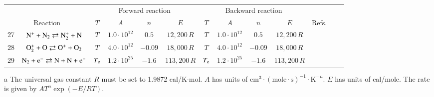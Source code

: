 \documentclass{warpdoc}
\renewcommand{\fontsizetable}{\footnotesize\scalefont{0.9}}
\begin{document}
\begin{table}[t]
\fontsizetable
\begin{center}
\begin{threeparttable}
\begin{tabular}{ccccccccccccc} 
\toprule
~&~&\multicolumn{4}{c}{Forward reaction} & \multicolumn{4}{c}{Backward reaction} & ~\\
 \cmidrule(lr){3-6}\cmidrule(lr){7-10}
\multicolumn{2}{c}{Reaction} & $T$ & $A$ & $n$ & $E$ & $T$  & $A$ & $n$ & $E$ & \multicolumn{1}{c}{Refs.}\\ 
\midrule                                          
27 & $\rm N^{+} + N_2 \rightleftarrows N_2^{+} + N $ &$T$ & $1.0 \cdot 10^{12}$ & $0.5$ & $12,200\, R$ 
                                          &$T$ & $1.0 \cdot 10^{12}$ & $0.5$ & $12,200\, R$ & \cite{book:1990:park} \\
                                          
28 & $\rm O_2^{+} + O \rightleftarrows O^{+} + O_2$ &$T$ & $4.0 \cdot 10^{12}$ & $-0.09$ & $18,000\, R$ 
                                          &$T$ & $4.0 \cdot 10^{12}$ & $-0.09$ & $18,000\, R$ & \cite{book:1990:park} \\
                                          
                                          
29 & $\rm N_2 + e^{-} \rightleftarrows N + N + e^{-}$ &$T_{\rm e}$ & $1.2 \cdot 10^{25}$ & $-1.6$ & $113,200\, R$ 
                                          &$T_{\rm e}$ & $1.2 \cdot 10^{25}$ & $-1.6$ & $113,200\, R$ & \cite{aiaaconf:1991:sharma} \\
                                          
                                          
\bottomrule
\end{tabular}
\begin{tablenotes}
\item[{a}] The universal gas constant $R$ must be set to 1.9872	cal/K$\cdot$mol. $A$ has units of $\textrm{cm}^3\cdot(\textrm{mole}\cdot \textrm{s})^{-1}\cdot \textrm{K}^{-n}$. $E$ has units of cal/mole. The rate is given by $A T^n \exp(-E/RT).$
\end{tablenotes}
\label{tab:kim2021b}
\end{threeparttable}
\end{center}
\end{table}
%
\end{document}
